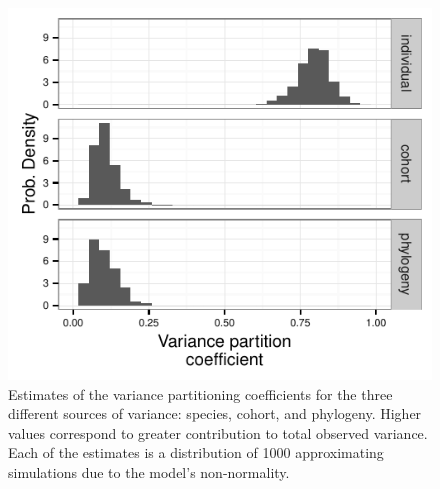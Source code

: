 \documentclass[12pt,letterpaper]{article}
\begin{document}
\begin{figure}[ht]
  \centering
  \includegraphics[height = 0.5\textheight, width = \textwidth, keepaspectratio = true]{figure/variance_est}
  \caption{Estimates of the variance partitioning coefficients for the three different sources of variance: species, cohort, and phylogeny. Higher values correspond to greater contribution to total observed variance. Each of the estimates is a distribution of 1000 approximating simulations due to the model's non-normality.}
  \label{fig:vpc}
\end{figure}
\end{document}
